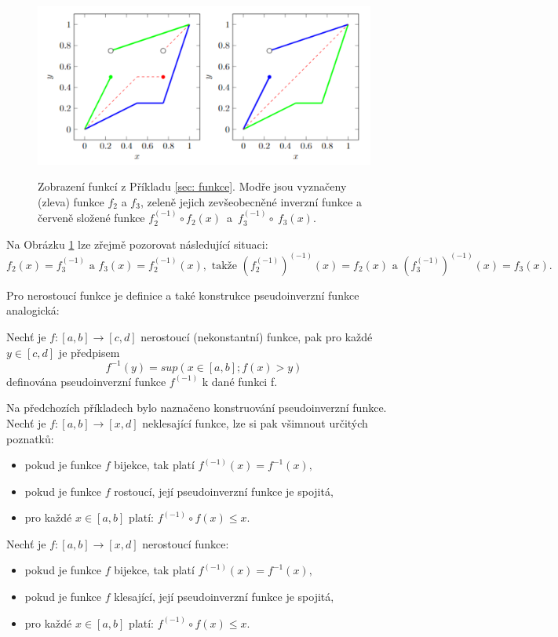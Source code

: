      \begin{figure}[H]
     \caption{Zobrazení funkcí z Příkladu \ref{sec: funkce}. Modře jsou vyznačeny (zleva) funkce $f_2$ a $f_3$, zeleně jejich zevšeobecněné inverzní funkce a červeně složené funkce $f_2^{(-1)} \circ f_2(x) $~a~$ f_3^{(-1)}\circ ~f_3(x).$}
                \hspace{-1cm}
                \includegraphics[scale=0.65]{template-fig/zevs_inverz.pdf}
                \centering
     \label{sec: inverz}
            \end{figure}


Na Obrázku \ref{sec: inverz} lze zřejmě pozorovat následující situaci: $$f_2(x)=f_3^{(-1)}\text{ a } f_3(x)=f_2^{(-1)}(x), \text{ takže } (f_2^{(-1)})^{(-1)}(x)=f_2(x) \text{ a }
            (f_3^{(-1)})^{(-1)}(x)=f_3(x).$$ 
            
 Pro nerostouc\'i funkce je definice a tak\'e konstrukce pseudoinverzn\'i funkce analogick\'a: 
\begin{definition}
    \cite{hlinena}
    Nech\v t je $f:[a,b] \rightarrow [c,d]$ nerostoucí (nekonstantní) funkce, pak pro každé $y \in [c,d]$ je předpisem $$f^{-1}(y) = sup(x \in [a,b];f(x)>y)$$
    definována pseudoinverzní funkce $f^{(-1)}$ k dané funkci f.
\end{definition}


\begin{remark} Na předchozích příkladech bylo naznačeno konstruování pseudoinverzní funkce. Nech\v t je $f:[a,b] \rightarrow [x,d]$ neklesající funkce, lze si pak všimnout určitých poznatk\r u:
    \begin{itemize}
        \item pokud je funkce $f$ bijekce, tak platí $f^{(-1)}(x) = f^{-1}(x),$
        \item  pokud je funkce $f$ rostoucí, její pseudoinverzní funkce je spojitá,
        \item  pro každé $x \in [a,b]$ platí: $f^{(-1)}\circ f(x)\leq x.$
    \end{itemize}
    Nech\v t je $f:[a,b] \rightarrow [x,d]$ nerostoucí funkce:
    \begin{itemize}
        \item pokud je funkce $f$ bijekce, tak platí $f^{(-1)}(x) = f^{-1}(x),$
        \item  pokud je funkce $f$ klesající, její pseudoinverzní funkce je spojitá,
        \item  pro každé $x \in [a,b]$ platí: $f^{(-1)}\circ f(x)\leq x.$
    \end{itemize}
\end{remark}

